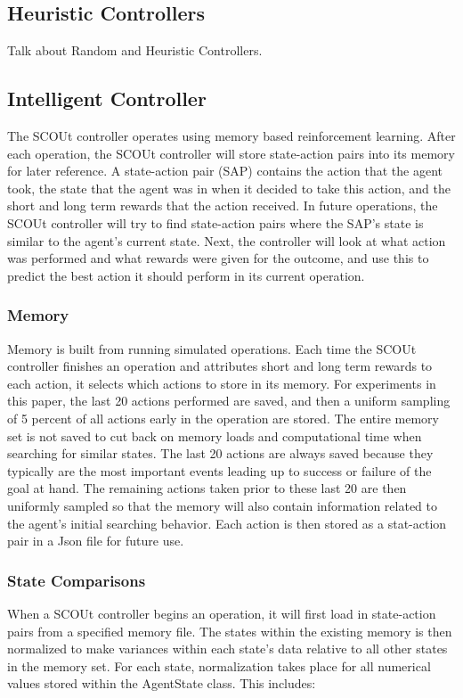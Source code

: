\subsection{Heuristic Controllers}
Talk about Random and Heuristic Controllers.


\subsection{Intelligent Controller}
The SCOUt controller operates using memory based reinforcement learning.
After each operation, the SCOUt controller will store state-action pairs into its memory for later reference.
A state-action pair (SAP) contains the action that the agent took, the state that the agent was in when it decided to take this action, and the short and long term rewards that the action received.
In future operations, the SCOUt controller will try to find state-action pairs where the SAP's state is similar to the agent's current state.
Next, the controller will look at what action was performed and what rewards were given for the outcome, and use this to predict the best action it should perform in its current operation.

\subsubsection{Memory}
Memory is built from running simulated operations.
Each time the SCOUt controller finishes an operation and attributes short and long term rewards to each action, it selects which actions to store in its memory.
For experiments in this paper, the last 20 actions performed are saved, and then a uniform sampling of 5 percent of all actions early in the operation are stored.
The entire memory set is not saved to cut back on memory loads and computational time when searching for similar states.
The last 20 actions are always saved because they typically are the most important events leading up to success or failure of the goal at hand.
The remaining actions taken prior to these last 20 are then uniformly sampled so that the memory will also contain information related to the agent's initial searching behavior.
Each action is then stored as a stat-action pair in a Json file for future use.


\subsubsection{State Comparisons}
When a SCOUt controller begins an operation, it will first load in state-action pairs from a specified memory file.
The states within the existing memory is then normalized to make variances within each state's data relative to all other states in the memory set.
For each state, normalization takes place for all numerical values stored within the AgentState class.
This includes:

